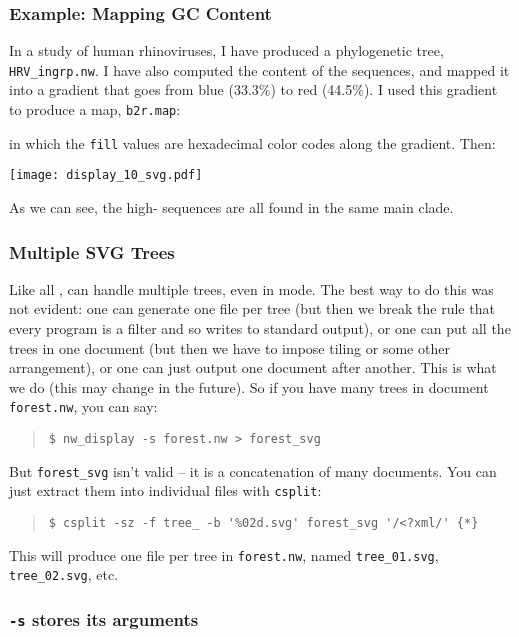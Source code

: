 \subsubsection{Example: Mapping GC Content}
\label{sct_display_ornament_xpl_gc}

In a study of human rhinoviruses, I have produced a phylogenetic tree,
\texttt{HRV\_ingrp.nw}. I have also computed the \gc{} content of the sequences,
and mapped it into a gradient that goes from {\color{Blue} blue} (33.3\%) to
{\color{Red} red} (44.5\%). I used this gradient to produce a \css{} map,
\texttt{b2r.map}:




\noindent{}in which the \texttt{fill} values are hexadecimal color codes along
the gradient. Then:


\texttt{[image: display\_10\_svg.pdf]}
\bigskip{}

\noindent{}As we can see, the high-\gc{} sequences are all found in the same
main clade.

\subsubsection{Multiple SVG Trees}

Like all \nutils, \display{} can handle multiple trees, even in \svg{} mode.
The best way to do this was not evident: one can generate one file per tree (but
then we break the rule that every program is a filter and so writes to standard
output), or one can put all the trees in one \svg{} document (but then we have
to impose tiling or some other arrangement), or one can just output one \svg{}
document after another. This is what we do (this may change in the future). So
if you have many trees in document \texttt{forest.nw}, you can say:
\begin{quote}
\verb+$ nw_display -s forest.nw > forest_svg+
\end{quote}
But \texttt{forest\_svg} isn't valid \svg{} -- it is a concatenation of many \svg{} documents. You can just extract them into individual files with \texttt{csplit}:
\begin{quote}
\verb+$ csplit -sz -f tree_ -b '%02d.svg' forest_svg '/<?xml/' {*}+
\end{quote}
This will produce one \svg{} file per tree in \texttt{forest.nw}, named \texttt{tree\_01.svg}, \texttt{tree\_02.svg}, etc.

\subsubsection{\display{} \texttt{-s} stores its arguments}

